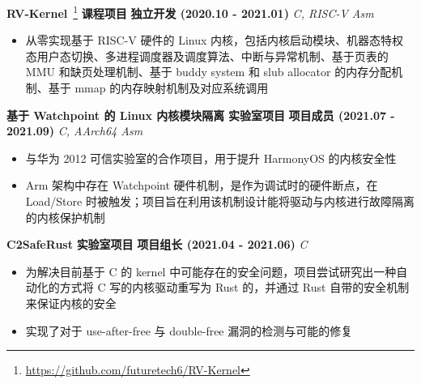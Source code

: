     \fi

    \noindent \textbf{RV-Kernel}~\footnote{\url{https://github.com/futuretech6/RV-Kernel}} \textbar{} \textbf{课程项目} \textbar{} \textbf{独立开发 (2020.10 - 2021.01)} \hfill \textsl{C, RISC-V Asm}

    \begin{itemize}
        \item 从零实现基于 RISC-V 硬件的 Linux 内核，包括内核启动模块、机器态特权态用户态切换、多进程调度器及调度算法、中断与异常机制、基于页表的 MMU 和缺页处理机制、基于 buddy system 和 slub allocator 的内存分配机制、基于 mmap 的内存映射机制及对应系统调用
    \end{itemize}

    \noindent \textbf{基于 Watchpoint 的 Linux 内核模块隔离} \textbar{} \textbf{实验室项目} \textbar{} \textbf{项目成员 (2021.07 - 2021.09)} \hfill \textsl{C, AArch64 Asm}

    \begin{itemize}
        \item 与华为 2012 可信实验室的合作项目，用于提升 HarmonyOS 的内核安全性
        \item Arm 架构中存在 Watchpoint 硬件机制，是作为调试时的硬件断点，在 Load/Store 时被触发；项目旨在利用该机制设计能将驱动与内核进行故障隔离的内核保护机制
    \end{itemize}

    \ifdefined\qr\else



        \noindent \textbf{C2SafeRust} \textbar{} \textbf{实验室项目} \textbar{} \textbf{项目组长 (2021.04 - 2021.06)} \hfill \textsl{C}

        \begin{itemize}
            \item 为解决目前基于 C 的 kernel 中可能存在的安全问题，项目尝试研究出一种自动化的方式将 C 写的内核驱动重写为 Rust 的，并通过 Rust 自带的安全机制来保证内核的安全
            \item 实现了对于 use-after-free 与 double-free 漏洞的检测与可能的修复
        \end{itemize}

    \fi

\fi
